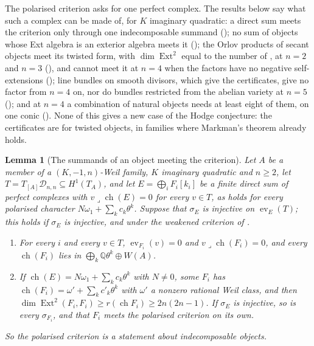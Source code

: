 \documentclass[11pt,reqno]{amsart}
\theoremstyle{plain}
\newtheorem{lemma}[theorem]{Lemma}
\theoremstyle{definition}
\theoremstyle{remark}
\newcommand{\QQ}{\mathbb{Q}}
\newcommand{\cD}{\mathcal{D}}
\newcommand{\HW}{W}                      %
\DeclareMathOperator{\ch}{ch}
\DeclareMathOperator{\Ext}{Ext}
\begin{document}
The polarised criterion asks for one perfect complex. The results below say
what such a complex can be made of, for $K$ imaginary quadratic: a direct sum
meets the criterion only through one indecomposable summand
(); no sum of objects whose Ext algebra is an
exterior algebra meets it (); the Orlov products of
secant objects meet its twisted form, with $\dim\Ext^{2}$ equal to the number
of , at $n=2$ and $n=3$ (), and
cannot meet it at $n=4$ when the factors have no negative self-extensions
(); line bundles on smooth divisors, which give the
certificates, give no factor from $n=4$ on, nor do bundles restricted from
the abelian variety at $n=5$ (); and at $n=4$ a combination of natural objects needs
at least eight of them, on one conic (). None of
this gives a new case of the Hodge conjecture: the certificates are for
twisted objects, in families where Markman's theorem already holds.

\begin{lemma}[The summands of an object meeting the criterion]
\label{lem:p2primesummands}
Let $A$ be a member of a $(K,-1,n)$-Weil family, $K$ imaginary quadratic and
$n\ge2$, let $T=T_{[A]}\cD_{n,n}\subseteq H^{1}(T_{A})$, and let
$E=\bigoplus_{i}F_{i}[k_{i}]$ be a finite direct sum of perfect complexes with
$v\lrcorner\ch(E)=0$ for every $v\in T$, as holds for every polarised character
$N\omega_{1}+\sum_{k}c_{k}\theta^{k}$. Suppose that $\sigma_{E}$ is injective on
$\operatorname{ev}_{E}(T)$; this holds if $\sigma_{E}$ is injective, and under
the weakened criterion of \cite[Question 11.4]{Mar25b}.
\begin{enumerate}[label=\textup{(\roman*)},leftmargin=2.6em,itemsep=2pt]
\item For every $i$ and every $v\in T$, $\operatorname{ev}_{F_{i}}(v)=0$ and
  $v\lrcorner\ch(F_{i})=0$, and every $\ch(F_{i})$ lies in
  $\bigoplus_{k}\QQ\theta^{k}\oplus\HW(A)$.
\item If $\ch(E)=N\omega_{1}+\sum_{k}c_{k}\theta^{k}$ with $N\ne0$, some
  $F_{i}$ has $\ch(F_{i})=\omega'+\sum_{k}c'_{k}\theta^{k}$ with $\omega'$ a
  nonzero rational Weil class, and then
  $\dim\Ext^{2}(F_{i},F_{i})\ge r(\ch F_{i})\ge2n(2n-1)$. If $\sigma_{E}$ is
  injective, so is every $\sigma_{F_{i}}$, and that $F_{i}$ meets the polarised
  criterion on its own.
\end{enumerate}
So the polarised criterion is a statement about indecomposable objects.
\end{lemma}
\end{document}
